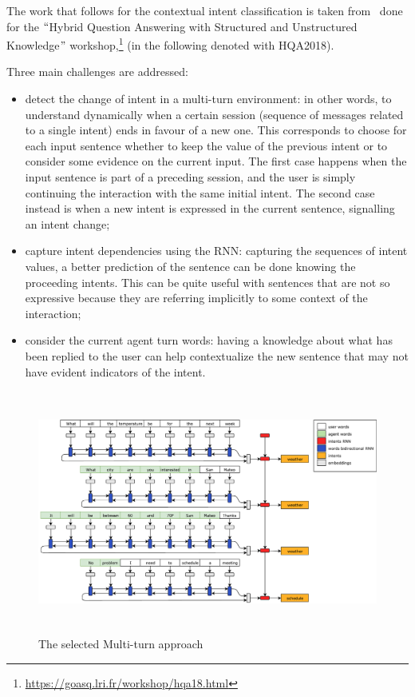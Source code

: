 The work that follows for the contextual intent classification is taken from~\cite{mensio2018multi} done for the $``$Hybrid Question Answering with Structured and Unstructured Knowledge$"$  workshop,\footnote{\url{https://goasq.lri.fr/workshop/hqa18.html}} (in the following denoted with HQA2018).

Three main challenges are addressed:

\begin{itemize}
	\item detect the change of intent in a multi-turn environment: in other words, to understand dynamically when a certain session (sequence of messages related to a single intent) ends in favour of a new one. This corresponds to choose for each input sentence whether to keep the value of the previous intent or to consider some evidence on the current input. The first case happens when the input sentence is part of a preceding session, and the user is simply continuing the interaction with the same initial intent. The second case instead is when a new intent is expressed in the current sentence, signalling an intent change;

	\item capture intent dependencies using the RNN: capturing the sequences of intent values, a better prediction of the sentence can be done knowing the proceeding intents. This can be quite useful with sentences that are not so expressive because they are referring implicitly to some context of the interaction;

	\item consider the current agent turn words: having a knowledge about what has been replied to the user can help contextualize the new sentence that may not have evident indicators of the intent.
\end{itemize}


\begin{figure}[!htbp]
    \centering
    \includegraphics[max width=\linewidth,max height=8cm,keepaspectratio]{figures/approachMultiTurn}
    \caption{The selected Multi-turn approach}\label{fig:approachMultiTurn}
\end{figure}

